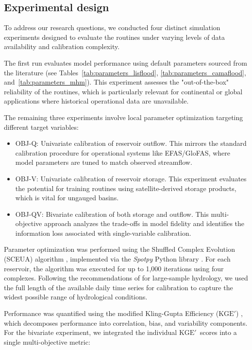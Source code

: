 \documentclass[hess, manuscript]{copernicus}
\newcommand{\calV}{OBJ-V}
\newcommand{\calQ}{OBJ-Q}
\newcommand{\calQV}{OBJ-QV}
\newcommand{\KGEmod}{$\text{KGE}'$}
\begin{document}
\subsection{Experimental design}
\label{sec:experimental_design}

To address our research questions, we conducted four distinct simulation experiments designed to evaluate the routines under varying levels of data availability and calibration complexity.

The first run evaluates model performance using default parameters sourced from the literature (see Tables~\ref{tab:parameters_lisflood}, \ref{tab:parameters_camaflood}, and~\ref{tab:parameters_mhm}). This experiment assesses the "out-of-the-box" reliability of the routines, which is particularly relevant for continental or global applications where historical operational data are unavailable.

The remaining three experiments involve local parameter optimization targeting different target variables:
\begin{itemize} 
    \item \calQ: Univariate calibration of reservoir outflow. This mirrors the standard calibration procedure for operational systems like EFAS/GloFAS, where model parameters are tuned to match observed streamflow. 
    \item \calV: Univariate calibration of reservoir storage. This experiment evaluates the potential for training routines using satellite-derived storage products, which is vital for ungauged basins. 
    \item \calQV: Bivariate calibration of both storage and outflow. This multi-objective approach analyzes the trade-offs in model fidelity and identifies the information loss associated with single-variable calibration. 
\end{itemize}

Parameter optimization was performed using the Shuffled Complex Evolution (SCEUA) algorithm \citep{Duan1993, Duan1994}, implemented via the \textit{Spotpy} Python library \citep{Houska2015}. For each reservoir, the algorithm was executed for up to 1,000 iterations using four complexes. Following the recommendations of \citet{Shen2024} for large-sample hydrology, we used the full length of the available daily time series for calibration to capture the widest possible range of hydrological conditions.

Performance was quantified using the modified Kling-Gupta Efficiency (\KGEmod) \citep{kling2012}, which decomposes performance into correlation, bias, and variability components. For the bivariate experiment, we integrated the individual \KGEmod\ scores into a single multi-objective metric:
\end{document}
